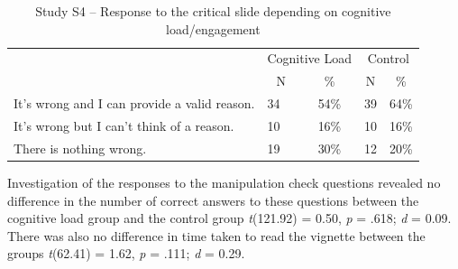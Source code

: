 \documentclass[
  man,floatsintext]{apa6}
\begin{document}
\begin{table}[tbp]

\begin{center}
\begin{threeparttable}

\caption{\label{tab:tabS4tab1dumb1all}Study S4 – Response to the critical slide depending on cognitive load/engagement}

\begin{tabular}{llccc}
\toprule
 & \multicolumn{2}{c}{Cognitive Load} & \multicolumn{2}{c}{Control} \\
\cmidrule(r){2-3} \cmidrule(r){4-5}
 & \multicolumn{1}{c}{N} & \multicolumn{1}{c}{\%} & \multicolumn{1}{c}{N} & \multicolumn{1}{c}{\%}\\
\midrule
It's wrong and I can provide a valid reason. & 34 & 54\% & 39 & 64\%\\
It's wrong but I can't think of a reason. & 10 & 16\% & 10 & 16\%\\
There is nothing wrong. & 19 & 30\% & 12 & 20\%\\
\bottomrule
\end{tabular}

\end{threeparttable}
\end{center}

\end{table}

Investigation of the responses to the manipulation check questions revealed no difference in the number of correct answers to these questions between the cognitive load group and the control group \emph{t}(121.92) = 0.50, \emph{p} = .618; \emph{d} = 0.09. There was also no difference in time taken to read the vignette between the groups \emph{t}(62.41) = 1.62, \emph{p} = .111; \emph{d} = 0.29.
\end{document}
